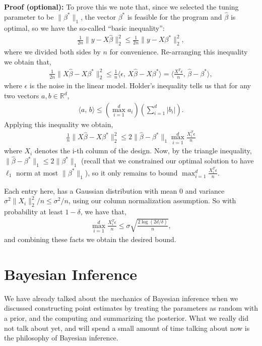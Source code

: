 \documentclass[twoside,12pt]{article}
\newcommand{\inprod}[2]{\ensuremath{\langle #1 , \, #2 \rangle}}
\begin{document}
{\bf Proof (optional): } To prove this we note that, since we selected the tuning parameter to be $\|\beta^*\|_1$, the vector $\beta^*$ is feasible for the program and $\widehat{\beta}$ is optimal, so we have the so-called ``basic inequality'':
\begin{align*}
\frac{1}{2n} \|y - X\widehat{\beta}\|_2^2 \leq \frac{1}{2n} \|y - X\beta^*\|_2^2,
\end{align*}
where we divided both sides by $n$ for convenience. Re-arranging this inequality we obtain that,
\begin{align*}
\frac{1}{2n} \|X\widehat{\beta} - X \beta^*\|_2^2 \leq \frac{1}{n} \inprod{\epsilon}{X\widehat{\beta} - X \beta^*} =  \inprod{\frac{X^{T} \epsilon}{n}}{\widehat{\beta} - \beta^*},
\end{align*}
where $\epsilon$ is the noise in the linear model. Holder's inequality tells us that for any two vectors $a,b \in \mathbb{R}^d$, 
\begin{align*}
\inprod{a}{b} \leq \left(\max_{i=1}^d a_i\right) \left( \sum_{i=1}^d |b_i| \right).
\end{align*}
Applying this inequality we obtain,
\begin{align*}
\frac{1}{n} \|X\widehat{\beta} - X \beta^*\|_2^2 \leq 2 \|\widehat{\beta} - \beta^*\|_1 \max_{i=1}^d \frac{X_i ^{T} \epsilon}{n}
\end{align*}
where $X_i$ denotes the i-th column of the design. Now, by the triangle inequality, $ \|\widehat{\beta} - \beta^*\|_1 \leq 2 \|\beta^*\|_1$ (recall that we constrained our optimal solution to have $\ell_1$ norm at most $\|\beta^*\|_1$), so it only remains to bound $\max_{i=1}^d \frac{X_i ^{T} \epsilon}{n}$.

Each entry here, has a Gaussian distribution with mean $0$ and variance $\sigma^2 \|X_i\|_2^2/n \leq \sigma^2/n$, using our column normalization assumption. So with probability at least $1 - \delta$, we have that,
\begin{align*}
\max_{i=1}^d \frac{X_i ^{T} \epsilon}{n} \leq \sigma \sqrt{ \frac{2 \log(2d/\delta)}{n}},
\end{align*}
and combining these facts we obtain the desired bound.


\section{Bayesian Inference}
We have already talked about the mechanics of Bayesian inference when we discussed constructing point estimates by treating the parameters as random with a prior, and the computing and summarizing the posterior. What we really did not talk about yet, and will spend a small amount of time talking about now is the philosophy of Bayesian inference.
\end{document}
